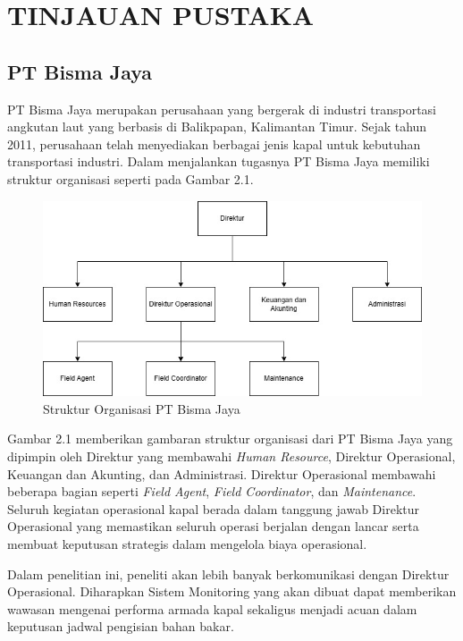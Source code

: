 \chapter{TINJAUAN PUSTAKA}

\section{PT Bisma Jaya}

\noindent PT Bisma Jaya merupakan perusahaan yang bergerak di industri transportasi angkutan laut yang berbasis di Balikpapan, Kalimantan Timur. Sejak tahun 2011, perusahaan telah menyediakan berbagai jenis kapal untuk kebutuhan transportasi industri. Dalam menjalankan tugasnya PT Bisma Jaya memiliki struktur organisasi seperti pada Gambar 2.1.

\begin{figure}[!h]
    \includegraphics[width=1\linewidth, center]{images/tinjauan-pustaka/fig-org-structure.jpg}
    \caption{Struktur Organisasi PT Bisma Jaya}
    \label{fig:org-structure}
\end{figure}

Gambar 2.1 memberikan gambaran struktur organisasi dari PT Bisma Jaya yang dipimpin oleh Direktur yang membawahi \textit{Human Resource}, Direktur Operasional, Keuangan dan Akunting, dan Administrasi. Direktur Operasional membawahi beberapa bagian seperti \textit{Field Agent}, \textit{Field Coordinator}, dan \textit{Maintenance}. Seluruh kegiatan operasional kapal berada dalam tanggung jawab Direktur Operasional yang memastikan seluruh operasi berjalan dengan lancar serta membuat keputusan strategis dalam mengelola biaya operasional.

Dalam penelitian ini, peneliti akan lebih banyak berkomunikasi dengan Direktur Operasional. Diharapkan Sistem Monitoring yang akan dibuat dapat memberikan wawasan mengenai performa armada kapal sekaligus menjadi acuan dalam keputusan jadwal pengisian bahan bakar.


